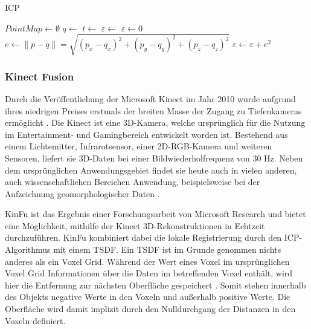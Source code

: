 \begin{algorithm}[ht]
\caption{\acl{ICP}}
\label{alg:icp}
\begin{algorithmic}
	\State $PointMap \gets \emptyset$
		\State $q \gets$ 
			\State {}
		\EndIf
	\EndFor
		\State $t \gets$ 
		\State {}
		\State $\varepsilon \gets$ 
	\EndWhile
\EndFunction
{}
	\State $\varepsilon \gets 0$
		\State $e \gets \|p - q\| = \sqrt{(p_x - q_x)^2 + (p_y - q_y)^2 + (p_z - q_z)^2}$
		\State $\varepsilon \gets \varepsilon + e^2$
	\EndFor
	\State \Return{$\varepsilon$}
\EndFunction
\end{algorithmic}
\end{algorithm}


\subsubsection{Kinect Fusion}
\label{subsubsec:kinfu}

Durch die Veröffentlichung der Microsoft Kinect im Jahr 2010 wurde aufgrund ihres niedrigen Preises erstmals der breiten Masse der Zugang zu Tiefenkameras ermöglicht \cite[1:55]{kinfuTalkYoutube}.
Die Kinect ist eine 3D-Kamera, welche ursprünglich für die Nutzung im Entertainment- und Gamingbereich entwickelt worden ist.
Bestehend aus einem Lichtemitter, Infrarotsensor, einer 2D-RGB-Kamera und weiteren Sensoren, liefert sie 3D-Daten bei einer Bildwiederholfrequenz von 30 Hz.
Neben dem ursprünglichen Anwendungsgebiet findet sie heute auch in vielen anderen, auch wissenschaftlichen Bereichen Anwendung, beispielsweise bei der Aufzeichnung geomorphologischer Daten \cite{mankoff2013kinect}.

\ac{KinFu} ist das Ergebnis einer Forschungsarbeit von Microsoft Research \cite{izadi2011kinectfusion} und bietet eine Möglichkeit, mithilfe der Kinect 3D-Rekonstruktionen in Echtzeit durchzuführen.
\ac{KinFu} kombiniert dabei die lokale Registrierung durch den \ac{ICP}-Algorithmus mit einem \ac{TSDF}.
Ein \ac{TSDF} ist im Grunde genommen nichts anderes als ein Voxel Grid.
Während der Wert eines Voxel im ursprünglichen Voxel Grid Informationen über die Daten im betreffenden Voxel enthält, wird hier die Entfernung zur nächsten Oberfläche gespeichert \cite{curless1996volumetric}.
Somit stehen innerhalb des Objekts negative Werte in den Voxeln und außerhalb positive Werte.
Die Oberfläche wird damit implizit durch den Nulldurchgang der Distanzen in den Voxeln definiert.

